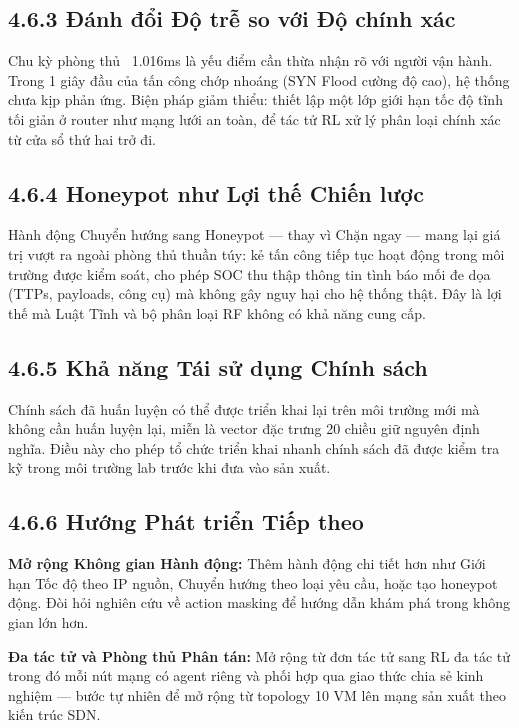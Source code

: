 \documentclass[12pt,a4paper,twoside]{report}
\begin{document}
{{{{{{{{{\subsection{4.6.3 Đánh đổi Độ trễ so với Độ chính xác}

Chu kỳ phòng thủ ~1.016ms là yếu điểm cần thừa nhận rõ với người vận hành. Trong 1 giây đầu của tấn công chớp nhoáng (SYN Flood cường độ cao), hệ thống chưa kịp phản ứng. Biện pháp giảm thiểu: thiết lập một lớp giới hạn tốc độ tĩnh tối giản ở router như mạng lưới an toàn, để tác tử RL xử lý phân loại chính xác từ cửa sổ thứ hai trở đi.

\subsection{4.6.4 Honeypot như Lợi thế Chiến lược}

Hành động Chuyển hướng sang Honeypot — thay vì Chặn ngay — mang lại giá trị vượt ra ngoài phòng thủ thuần túy: kẻ tấn công tiếp tục hoạt động trong môi trường được kiểm soát, cho phép SOC thu thập thông tin tình báo mối đe dọa (TTPs, payloads, công cụ) mà không gây nguy hại cho hệ thống thật. Đây là lợi thế mà Luật Tĩnh và bộ phân loại RF không có khả năng cung cấp.

\subsection{4.6.5 Khả năng Tái sử dụng Chính sách}

Chính sách đã huấn luyện có thể được triển khai lại trên môi trường mới mà không cần huấn luyện lại, miễn là vector đặc trưng 20 chiều giữ nguyên định nghĩa. Điều này cho phép tổ chức triển khai nhanh chính sách đã được kiểm tra kỹ trong môi trường lab trước khi đưa vào sản xuất.

\subsection{4.6.6 Hướng Phát triển Tiếp theo}

\textbf{Mở rộng Không gian Hành động:} Thêm hành động chi tiết hơn như Giới hạn Tốc độ theo IP nguồn, Chuyển hướng theo loại yêu cầu, hoặc tạo honeypot động. Đòi hỏi nghiên cứu về action masking để hướng dẫn khám phá trong không gian lớn hơn.

\textbf{Đa tác tử và Phòng thủ Phân tán:} Mở rộng từ đơn tác tử sang RL đa tác tử trong đó mỗi nút mạng có agent riêng và phối hợp qua giao thức chia sẻ kinh nghiệm — bước tự nhiên để mở rộng từ topology 10 VM lên mạng sản xuất theo kiến trúc SDN.

}}}}}}}}}
\end{document}
